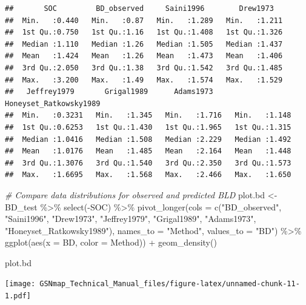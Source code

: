\documentclass[
  10pt,
  b5paper,
  oneside]{book}
\newenvironment{Shaded}{\begin{snugshade}}{\end{snugshade}}
\newcommand{\AttributeTok}[1]{\textcolor[rgb]{0.77,0.63,0.00}{#1}}
\newcommand{\CommentTok}[1]{\textcolor[rgb]{0.56,0.35,0.01}{\textit{#1}}}
\newcommand{\FunctionTok}[1]{\textcolor[rgb]{0.00,0.00,0.00}{#1}}
\newcommand{\NormalTok}[1]{#1}
\newcommand{\OtherTok}[1]{\textcolor[rgb]{0.56,0.35,0.01}{#1}}
\newcommand{\SpecialCharTok}[1]{\textcolor[rgb]{0.00,0.00,0.00}{#1}}
\newcommand{\StringTok}[1]{\textcolor[rgb]{0.31,0.60,0.02}{#1}}
\begin{document}
\begin{verbatim}
##       SOC         BD_observed     Saini1996        Drew1973    
##  Min.   :0.440   Min.   :0.87   Min.   :1.289   Min.   :1.211  
##  1st Qu.:0.750   1st Qu.:1.16   1st Qu.:1.408   1st Qu.:1.326  
##  Median :1.110   Median :1.26   Median :1.505   Median :1.437  
##  Mean   :1.424   Mean   :1.26   Mean   :1.473   Mean   :1.406  
##  3rd Qu.:2.050   3rd Qu.:1.38   3rd Qu.:1.542   3rd Qu.:1.485  
##  Max.   :3.200   Max.   :1.49   Max.   :1.574   Max.   :1.529  
##   Jeffrey1979       Grigal1989      Adams1973     Honeyset_Ratkowsky1989
##  Min.   :0.3231   Min.   :1.345   Min.   :1.716   Min.   :1.148         
##  1st Qu.:0.6253   1st Qu.:1.430   1st Qu.:1.965   1st Qu.:1.315         
##  Median :1.0416   Median :1.508   Median :2.229   Median :1.492         
##  Mean   :1.0176   Mean   :1.485   Mean   :2.164   Mean   :1.448         
##  3rd Qu.:1.3076   3rd Qu.:1.540   3rd Qu.:2.350   3rd Qu.:1.573         
##  Max.   :1.6695   Max.   :1.568   Max.   :2.466   Max.   :1.650
\end{verbatim}

\begin{Shaded}
\begin{Highlighting}[]
\CommentTok{\# Compare data distributions for observed and predicted BLD}
\NormalTok{plot.bd }\OtherTok{\textless{}{-}}\NormalTok{ BD\_test }\SpecialCharTok{\%\textgreater{}\%}
  \FunctionTok{select}\NormalTok{(}\SpecialCharTok{{-}}\NormalTok{SOC) }\SpecialCharTok{\%\textgreater{}\%} 
  \FunctionTok{pivot\_longer}\NormalTok{(}\AttributeTok{cols =} \FunctionTok{c}\NormalTok{(}\StringTok{"BD\_observed"}\NormalTok{, }\StringTok{"Saini1996"}\NormalTok{, }\StringTok{"Drew1973"}\NormalTok{, }\StringTok{"Jeffrey1979"}\NormalTok{,}
                        \StringTok{"Grigal1989"}\NormalTok{, }\StringTok{"Adams1973"}\NormalTok{, }\StringTok{"Honeyset\_Ratkowsky1989"}\NormalTok{), }
               \AttributeTok{names\_to =} \StringTok{"Method"}\NormalTok{, }\AttributeTok{values\_to =} \StringTok{"BD"}\NormalTok{) }\SpecialCharTok{\%\textgreater{}\%} 
  \FunctionTok{ggplot}\NormalTok{(}\FunctionTok{aes}\NormalTok{(}\AttributeTok{x =}\NormalTok{ BD, }\AttributeTok{color =}\NormalTok{ Method)) }\SpecialCharTok{+} 
  \FunctionTok{geom\_density}\NormalTok{()}

\NormalTok{plot.bd}
\end{Highlighting}
\end{Shaded}

\texttt{[image: GSNmap\_Technical\_Manual\_files/figure-latex/unnamed-chunk-11-1.pdf]}
\end{document}
